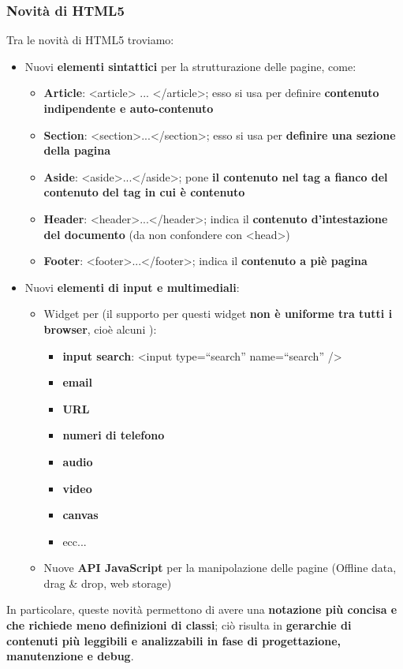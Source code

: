\documentclass[12pt]{article}
\begin{document}
\subsubsection{Novità di HTML5}
Tra le novità di HTML5 troviamo:
\begin{itemize}
    \item Nuovi \textbf{elementi sintattici} per la strutturazione delle pagine, come:
    \begin{itemize}
        \item \textbf{Article}: <article> ... </article>; esso si usa per definire \textbf{contenuto indipendente e auto-contenuto}
        \item \textbf{Section}: <section>...</section>; esso si usa per \textbf{definire una sezione della pagina}
        \item \textbf{Aside}: <aside>...</aside>; pone \textbf{il contenuto nel tag a fianco del contenuto del tag in cui è contenuto}
        \item \textbf{Header}: <header>...</header>; indica il \textbf{contenuto d'intestazione del documento} (da non confondere con <head>)
        \item \textbf{Footer}: <footer>...</footer>; indica il \textbf{contenuto a piè pagina}
    \end{itemize}
    \item Nuovi \textbf{elementi di input e multimediali}:
    \begin{itemize}
        \item Widget per (il supporto per questi widget \textbf{non è uniforme tra tutti i browser}, cioè alcuni ):
        \begin{itemize}
            \item \textbf{input search}: <input type=“search” name=“search” />
            \item \textbf{email}
            \item \textbf{URL}
            \item \textbf{numeri di telefono}
            \item \textbf{audio}
            \item \textbf{video}
            \item \textbf{canvas}
            \item ecc...
        \end{itemize}
        \item Nuove \textbf{API JavaScript} per la manipolazione delle pagine (Offline data, drag \& drop, web storage)
    \end{itemize}
\end{itemize}
In particolare, queste novità permettono di avere una \textbf{notazione più concisa e che richiede meno definizioni di classi}; ciò risulta in \textbf{gerarchie di contenuti più leggibili e analizzabili in fase di progettazione, manutenzione e debug}.
\end{document}
